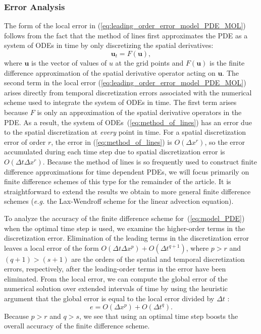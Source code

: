\documentclass[fleqn,12pt,twoside]{article}
\newcommand{\beq}{\begin{equation}}
\newcommand{\eeq}{\end{equation}}
\def\dt{\Delta t}
\def\dx{\Delta x}
\def\eg{\emph{e.g. }}
\begin{document}
\subsubsection*{Error Analysis \label{sec:error_analysis}}
The form of the local error in 
(\ref{eq:leading_order_error_model_PDE_MOL}) follows from the fact 
that the method of lines first approximates the PDE as a system of ODEs in 
time by only discretizing the spatial derivatives: 
\beq
{\mathbf u}_t = F({\mathbf u}),
\label{eq:method_of_lines}
\eeq
where ${\mathbf u}$ is the vector of values of $u$ at the grid points and
$F({\mathbf u})$ is the finite difference approximation of the spatial 
derivative operator acting on ${\mathbf u}$.  The second term in the local 
error (\ref{eq:leading_order_error_model_PDE_MOL}) arises directly from 
temporal discretization errors associated with the numerical scheme used to 
integrate the system of ODEs in time.  The first term arises because $F$ is 
only an approximation of the spatial derivative operators in the PDE.  As a 
result, the system of ODEs~(\ref{eq:method_of_lines}) has an error due to 
the spatial discretization at \emph{every} point in time.  For a spatial 
discretization error of order $r$, the error in (\ref{eq:method_of_lines}) is 
$O(\dx^r)$, so the error accumulated during each time step due to 
spatial discretization error is $O(\dt \dx^r)$.  Because the method of 
lines is so frequently used to construct finite difference approximations for 
time dependent PDEs, we will focus primarily on finite difference schemes of 
this type for the remainder of the article.  It is straightforward to extend 
the results we obtain to more general finite difference schemes (\eg the
Lax-Wendroff scheme for the linear advection equation). 

To analyze the accuracy of the finite difference scheme 
for~(\ref{eq:model_PDE}) when the optimal time step is used, we examine the 
higher-order terms in the discretization error.  Elimination of the leading 
terms in the discretization error leaves a local error of the form 
$O(\dt \dx^p) + O(\dt^{q+1})$, where $p>r$ and $(q+1) > (s+1)$ are the orders 
of the spatial and temporal discretization errors, respectively, after the 
leading-order terms in the error have been eliminated.  
From the local error, we can compute the global error of the numerical 
solution over extended intervals of time by using the heuristic 
argument that the global error is equal to the local error divided by 
$\dt$ \cite{gko_book}:
\beq
e = O(\dx^p) + O(\dt^q).
\label{eq:global_error_ots}
\eeq
Because $p > r$ and $q > s$, we see that using an optimal time step 
boosts the overall accuracy of the finite difference scheme.
\end{document}
